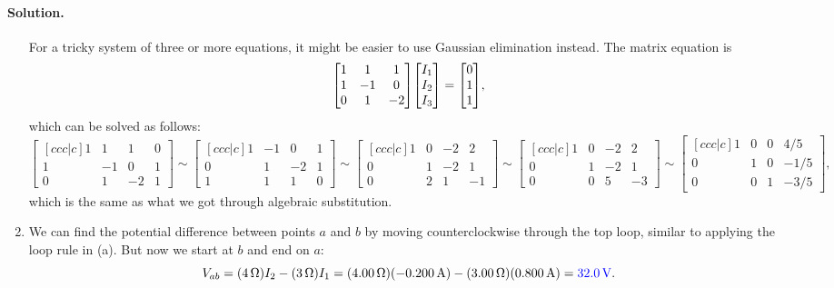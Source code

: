 \documentclass[11pt]{article}
\newcommand{\beq}{\begin{equation*}}
\newcommand{\eeq}{\end{equation*}}
\newenvironment{solution}
{
    \paragraph{Solution.}
    \ignorespaces
}
{
    \bigskip
}
\begin{document}
\begin{solution}
\begin{enumerate}
		For a tricky system of three or more equations, it might be easier to use Gaussian elimination instead.  The matrix equation is
		\beq
			\mqty[ 1 & 1 & 1 \\
				1 & -1 & 0 \\
				0 & 1 & -2 ]
				\mqty[ \Iq \\ \Iw \\ \Ie ]
				= \mqty[ 0 \\ 1 \\ 1 ],
		\eeq
		which can be solved as follows:
		\beq
			\begin{bmatrix}[c c c | c]
				1 & 1 & 1 & 0 \\
				1 & -1 & 0 & 1 \\
				0 & 1 & -2 & 1
			\end{bmatrix}
			\sim
			\begin{bmatrix}[c c c | c]
				1 & -1 & 0 & 1 \\
				0 & 1 & -2 & 1 \\
				1 & 1 & 1 & 0
			\end{bmatrix}
			\sim
			\begin{bmatrix}[c c c | c]
				1 & 0 & -2 & 2 \\
				0 & 1 & -2 & 1 \\
				0 & 2 & 1 & -1
			\end{bmatrix}
			\sim
			\begin{bmatrix}[c c c | c]
				1 & 0 & -2 & 2 \\
				0 & 1 & -2 & 1 \\
				0 & 0 & 5 & -3
			\end{bmatrix}
			\sim
			\begin{bmatrix}[c c c | c]
				1 & 0 & 0 & 4/5 \\
				0 & 1 & 0 & -1/5 \\
				0 & 0 & 1 & -3/5
			\end{bmatrix},
		\eeq
		which is the same as what we got through algebraic substitution.
		
		\vfill
		
		\item We can find the potential difference between points $a$ and $b$ by moving counterclockwise through the top loop, similar to applying the loop rule in (a).  But now we start at $b$ and end on $a$:
		\beq
			\Vab = (\Sohm{4}) \Iw - (\Sohm{3}) \Iq
			= (\Sohm{4.00}) (-\Samp{0.200}) - (\Sohm{3.00}) (\Samp{0.800})
			= {\color{blue} \Svolt{32.0}}.
		\eeq
	\end{enumerate}
\end{solution}
\end{document}
